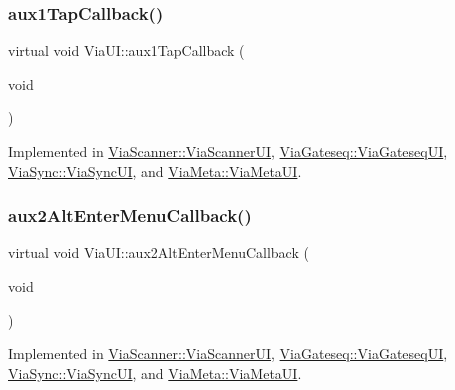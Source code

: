 \mbox{\label{class_via_u_i_a2942ec6f7d495159258e1f1803e62c4d}} 
\subsubsection{\texorpdfstring{aux1\+Tap\+Callback()}{aux1TapCallback()}}
{\footnotesize\ttfamily virtual void Via\+U\+I\+::aux1\+Tap\+Callback (\begin{DoxyParamCaption}\item[{void}]{ }\end{DoxyParamCaption})\hspace{0.3cm}{\ttfamily [pure virtual]}}



Implemented in \mbox{\hyperlink{class_via_scanner_1_1_via_scanner_u_i_af7e91846bdd9922b309580adf4fe653b}{Via\+Scanner\+::\+Via\+Scanner\+UI}}, \mbox{\hyperlink{class_via_gateseq_1_1_via_gateseq_u_i_a3f44c4a89f3f7aedff958e903e6c71b5}{Via\+Gateseq\+::\+Via\+Gateseq\+UI}}, \mbox{\hyperlink{class_via_sync_1_1_via_sync_u_i_a53f8add06247c8ed4e7a1c049e8136fb}{Via\+Sync\+::\+Via\+Sync\+UI}}, and \mbox{\hyperlink{class_via_meta_1_1_via_meta_u_i_ad95b464f8dda873be1c24622d1f082fa}{Via\+Meta\+::\+Via\+Meta\+UI}}.

\mbox{\label{class_via_u_i_a08a746b666d37ac6bc293303187fd6be}} 
\subsubsection{\texorpdfstring{aux2\+Alt\+Enter\+Menu\+Callback()}{aux2AltEnterMenuCallback()}}
{\footnotesize\ttfamily virtual void Via\+U\+I\+::aux2\+Alt\+Enter\+Menu\+Callback (\begin{DoxyParamCaption}\item[{void}]{ }\end{DoxyParamCaption})\hspace{0.3cm}{\ttfamily [pure virtual]}}



Implemented in \mbox{\hyperlink{class_via_scanner_1_1_via_scanner_u_i_a649f3b095e254e2e2049c91f5c9543b2}{Via\+Scanner\+::\+Via\+Scanner\+UI}}, \mbox{\hyperlink{class_via_gateseq_1_1_via_gateseq_u_i_a39db35560b35c8fafeaabef258be61d8}{Via\+Gateseq\+::\+Via\+Gateseq\+UI}}, \mbox{\hyperlink{class_via_sync_1_1_via_sync_u_i_a6a382c3c2660d7f232d38f5a4f7da110}{Via\+Sync\+::\+Via\+Sync\+UI}}, and \mbox{\hyperlink{class_via_meta_1_1_via_meta_u_i_ab0ccbc22f2460565456b8347d18634b8}{Via\+Meta\+::\+Via\+Meta\+UI}}.

